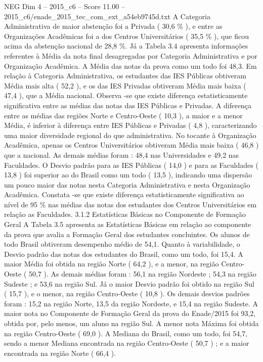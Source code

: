 \begin{textsample}{NEG Dim 4 – 2015\_c6 – Score 11.00 – 2015\_c6/enade\_2015\_tec\_com\_ext\_a54eb9745d.txt}
A Categoria Administrativa de maior abstenção foi a Privada ( 30,6 \% ), e entre as Organizações Acadêmicas foi a dos Centros Universitários ( 35,5 \% ), que ficou acima da abstenção nacional de 28,8 \%.
Já a Tabela 3.4 apresenta informações referentes à Média da nota final desagregadas por Categoria Administrativa e por Organização Acadêmica.
A Média das notas da prova como um todo foi 48,3.
Em relação à Categoria Administrativa, os estudantes das IES Públicas obtiveram Média mais alta ( 52,2 ), e os das IES Privadas obtiveram Média mais baixa ( 47,4 ), que a Média nacional.
Observa -se que existe diferença estatisticamente significativa entre as médias das notas das IES Públicas e Privadas.
A diferença entre as médias das regiões Norte e Centro-Oeste ( 10,3 ), a maior e a menor Média, é inferior à diferença entre IES Públicas e Privadas ( 4,8 ), caracterizando uma maior diversidade regional do que administrativa.
No tocante à Organização Acadêmica, apenas os Centros Universitários obtiveram Média mais baixa ( 46,8 ) que a nacional.
As demais médias foram : 48,4 nas Universidades e 49,2 nas Faculdades.
O Desvio padrão para as IES Públicas ( 14,0 ) e para as Faculdades ( 13,8 ) foi superior ao do Brasil como um todo ( 13,5 ), indicando uma dispersão um pouco maior das notas nesta Categoria Administrativa e nesta Organização Acadêmica.
Constata -se que existe diferença estatisticamente significativa ao nível de 95 \% nas médias das notas dos estudantes dos Centros Universitários em relação as Faculdades. 3.1.2 Estatísticas Básicas no Componente de Formação Geral A Tabela 3.5 apresenta as Estatísticas Básicas em relação ao componente da prova que avalia a Formação Geral dos estudantes concluintes.
Os alunos de todo Brasil obtiveram desempenho médio de 54,1.
Quanto à variabilidade, o Desvio padrão das notas dos estudantes do Brasil, como um todo, foi 15,4.
A maior Média foi obtida na região Norte ( 64,2 ), e a menor, na região Centro-Oeste ( 50,7 ).
As demais médias foram : 56,1 na região Nordeste ; 54,3 na região Sudeste ; e 53,6 na região Sul.
Já o maior Desvio padrão foi obtido na região Sul ( 15,7 ), e o menor, na região Centro-Oeste ( 10,8 ).
Os demais desvios padrões foram : 15,2 na região Norte, 13,5 da região Nordeste, e 15,4 na região Sudeste.
A maior nota no Componente de Formação Geral da prova do Enade/2015 foi 93,2, obtida por, pelo menos, um aluno na região Sul.
A menor nota Máxima foi obtida na região Centro-Oeste ( 69,0 ).
A Mediana do Brasil, como um todo, foi 54,7, sendo a menor Mediana encontrada na região Centro-Oeste ( 50,7 ) ; e a maior encontrada na região Norte ( 66,4 ).

\end{textsample}
